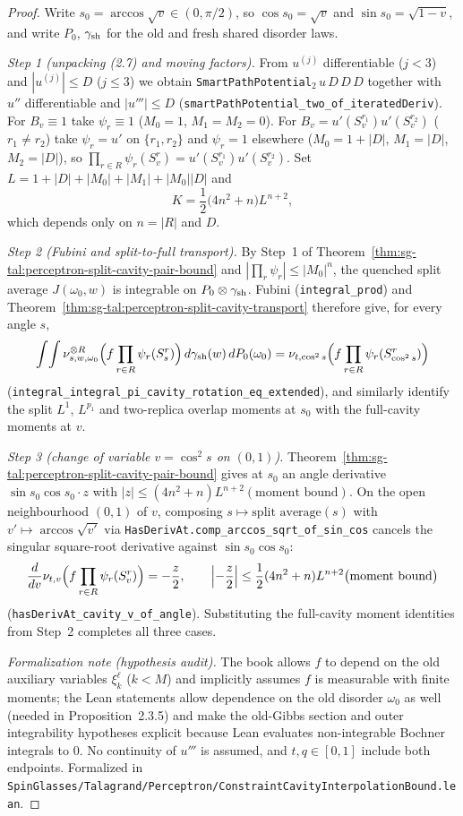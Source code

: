 \begin{proof}
  \leanok
Write $s_0=\arccos\sqrt v\in(0,\pi/2)$, so $\cos s_0=\sqrt v$ and $\sin s_0=\sqrt{1-v}$, and write $P_0$, $\gamma_{\rm sh}$
for the old and fresh shared disorder laws.

\emph{Step 1 (unpacking (2.7) and moving factors).} From $u^{(j)}$ differentiable ($j<3$) and $|u^{(j)}|\le D$ ($j\le 3$) we
obtain \texttt{SmartPathPotential}$_2\,u\,D\,D\,D$ together with $u''$ differentiable and $|u'''|\le D$
(\texttt{smartPathPotential\_two\_of\_iteratedDeriv}). For $B_v\equiv1$ take $\psi_r\equiv1$ ($M_0=1$, $M_1=M_2=0$). For
$B_v=u'(S_v^{r_1})u'(S_v^{r_2})$ ($r_1\ne r_2$) take $\psi_r=u'$ on $\{r_1,r_2\}$ and $\psi_r=1$ elsewhere ($M_0=1+|D|$,
$M_1=|D|$, $M_2=|D|$), so $\prod_{r\in R}\psi_r(S_v^r)=u'(S_v^{r_1})u'(S_v^{r_2})$. Set $L=1+|D|+|M_0|+|M_1|+|M_0||D|$ and
\[
 K=\frac12\bigl(4n^2+n\bigr)L^{n+2},
\]
which depends only on $n=|R|$ and $D$.

\emph{Step 2 (Fubini and split-to-full transport).} By Step~1 of Theorem~\ref{thm:sg-tal:perceptron-split-cavity-pair-bound} and
$|\prod_r\psi_r|\le|M_0|^n$, the quenched split average $J(\omega_0,w)$ is integrable on $P_0\otimes\gamma_{\rm sh}$. Fubini
(\texttt{integral\_prod}) and Theorem~\ref{thm:sg-tal:perceptron-split-cavity-transport} therefore give, for every angle $s$,
\[
 \int\!\int \nu_{s,w,\omega_0}^{\otimes R}\Bigl(f\prod_{r\in R}\psi_r(S_s^r)\Bigr)\,d\gamma_{\rm sh}(w)\,dP_0(\omega_0)
 =\nu_{t,\cos^2 s}\Bigl(f\prod_{r\in R}\psi_r(S_{\cos^2 s}^r)\Bigr)
\]
(\texttt{integral\_integral\_pi\_cavity\_rotation\_eq\_extended}), and similarly identify the split $L^1$, $L^{p_1}$ and
two-replica overlap moments at $s_0$ with the full-cavity moments at $v$.

\emph{Step 3 (change of variable $v=\cos^2 s$ on $(0,1)$).} Theorem~\ref{thm:sg-tal:perceptron-split-cavity-pair-bound} gives
at $s_0$ an angle derivative $\sin s_0\cos s_0\cdot z$ with $|z|\le(4n^2+n)L^{n+2}(\text{moment bound})$. On the open neighbourhood
$(0,1)$ of $v$, composing $s\mapsto\text{split average}(s)$ with $v'\mapsto\arccos\sqrt{v'}$ via
\texttt{HasDerivAt.comp\_arccos\_sqrt\_of\_sin\_cos} cancels the singular square-root derivative against $\sin s_0\cos s_0$:
\[
 \frac{d}{dv}\nu_{t,v}\Bigl(f\prod_{r\in R}\psi_r(S_v^r)\Bigr)=-\frac{z}{2},\qquad
 \Bigl|-\frac{z}{2}\Bigr|\le\frac12(4n^2+n)L^{n+2}\bigl(\text{moment bound}\bigr)
\]
(\texttt{hasDerivAt\_cavity\_v\_of\_angle}). Substituting the full-cavity moment identities from Step~2 completes all three cases.

\emph{Formalization note (hypothesis audit).} The book allows $f$ to depend on the old auxiliary variables $\xi_k^\ell$ ($k<M$) and
implicitly assumes $f$ is measurable with finite moments; the Lean statements allow dependence on the old disorder $\omega_0$ as well
(needed in Proposition~2.3.5) and make the old-Gibbs section and outer integrability hypotheses explicit because Lean evaluates
non-integrable Bochner integrals to $0$. No continuity of $u'''$ is assumed, and $t,q\in[0,1]$ include both endpoints.
Formalized in \texttt{SpinGlasses/Talagrand/Perceptron/ConstraintCavityInterpolationBound.lean}.
\end{proof}


